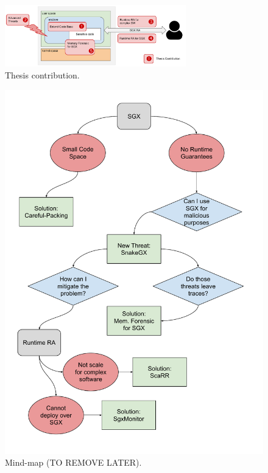\begin{figure}[t]
	\centering
	\includegraphics[width=0.7\textwidth]{fig_c1/contribution.pdf}
	\caption[Thesis contribution.]{Thesis contribution.}
	\label{fig:contribution}
\end{figure}

\begin{figure}[t]
	\centering
	\includegraphics[width=\textwidth]{fig_c1/mind-map.pdf}
	\caption[Mind-map.]{Mind-map (TO REMOVE LATER).}
	\label{fig:mind-map}
\end{figure}


